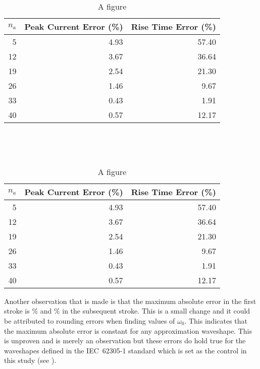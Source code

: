 \captionsetup[subtable]{position=bottom}
\begin{table}[htbp]
    \centering
    \caption{A figure}\label{fig:1}
    \begin{subtable}{}
        \centering
        \label{fig:1a}\\
        \begin{tabular}{rrr}
            \textbf{$n_a$} & \textbf{Peak Current Error (\%)} & \textbf{Rise Time Error (\%)} \\
            \hline
            5 & 4.93 & 57.40 \\
            12 & 3.67 & 36.64 \\
            19 & 2.54 & 21.30 \\
            26 & 1.46 & 9.67 \\
            33 & 0.43 & 1.91 \\
            40 & 0.57 & 12.17
        \end{tabular}
    \end{subtable}\\
    \begin{subtable}{}
        \centering
        \label{fig:1b}\\
        \begin{tabular}{rrr}
            \textbf{$n_a$} & \textbf{Peak Current Error (\%)} & \textbf{Rise Time Error (\%)} \\
            \hline
            5 & 4.93 & 57.40 \\
            12 & 3.67 & 36.64 \\
            19 & 2.54 & 21.30 \\
            26 & 1.46 & 9.67 \\
            33 & 0.43 & 1.91 \\
            40 & 0.57 & 12.17
        \end{tabular}
    \end{subtable}
\end{table}

Another observation that is made is that the maximum absolute error in the first stroke is \unskip \% and \unskip \% in the subsequent stroke. This is a small change and it could be attributed to rounding errors when finding values of $\omega_0$. This indicates that the maximum absolute error is constant for any approximation waveshape. This is unproven and is merely an observation but these errors do hold true for the waveshapes defined in the IEC~62305-1 standard which is set as the control in this study (see ).

